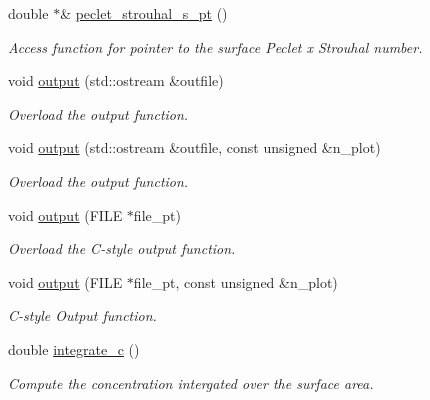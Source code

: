 \begin{DoxyCompactItemize}
double $\ast$\& \hyperlink{classoomph_1_1SurfactantTransportInterfaceElement_a422fa3f65ca6635b6bfbe993e01bce72}{peclet\+\_\+strouhal\+\_\+s\+\_\+pt} ()
\begin{DoxyCompactList}\small\item\em Access function for pointer to the surface Peclet x Strouhal number. \end{DoxyCompactList}\item 
void \hyperlink{classoomph_1_1SurfactantTransportInterfaceElement_a280f065d9cb85438c0fe4f7cd95d14b3}{output} (std\+::ostream \&outfile)
\begin{DoxyCompactList}\small\item\em Overload the output function. \end{DoxyCompactList}\item 
void \hyperlink{classoomph_1_1SurfactantTransportInterfaceElement_aebc3ed4954b636f4992a212c7973c670}{output} (std\+::ostream \&outfile, const unsigned \&n\+\_\+plot)
\begin{DoxyCompactList}\small\item\em Overload the output function. \end{DoxyCompactList}\item 
void \hyperlink{classoomph_1_1SurfactantTransportInterfaceElement_a32ae151a017b122dd7a4c03511afbcc9}{output} (F\+I\+LE $\ast$file\+\_\+pt)
\begin{DoxyCompactList}\small\item\em Overload the C-\/style output function. \end{DoxyCompactList}\item 
void \hyperlink{classoomph_1_1SurfactantTransportInterfaceElement_ad41354dbe1ae8291e3330b3752b525f8}{output} (F\+I\+LE $\ast$file\+\_\+pt, const unsigned \&n\+\_\+plot)
\begin{DoxyCompactList}\small\item\em C-\/style Output function. \end{DoxyCompactList}\item 
double \hyperlink{classoomph_1_1SurfactantTransportInterfaceElement_a703c35a6da2925926c976957f2da77c4}{integrate\+\_\+c} ()
\begin{DoxyCompactList}\small\item\em Compute the concentration intergated over the surface area. \end{DoxyCompactList}\end{DoxyCompactItemize}
